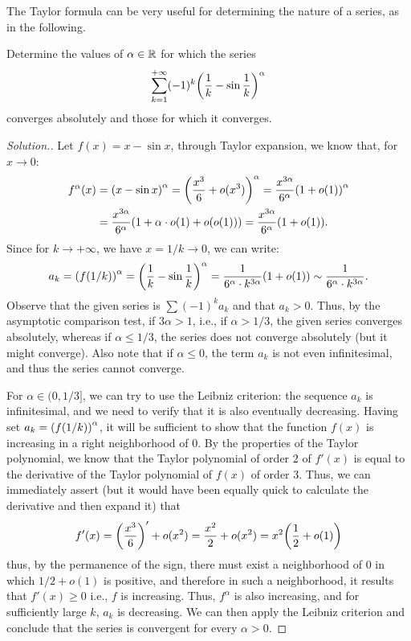 The Taylor formula can be very useful for determining the nature of a series, as
in the following.
\begin{exercise}
Determine the values of $\alpha \in {\mathbb R}$ for which the series
\[
  \sum_{k=1}^{+\infty}(-1)^k {\left( \frac 1 k - \sin \frac 1 k \right)}^\alpha
\]
converges absolutely and those for which it converges.
\end{exercise}
\begin{proof}[Solution.]
Let $f(x) = x - \sin x$,
through Taylor expansion, we know that,
for $x\to 0$:
\begin{align*}
   f^\alpha(x) &= {\left( x - \sin x \right)}^\alpha
   =  {\left( \frac{x^3}{6} + o(x^3) \right)}^\alpha
   = \frac{x^{3\alpha}}{6^\alpha}{\left( 1+o(1) \right)}^\alpha\\
   & = \frac{x^{3\alpha}}{6^\alpha}{\left( 1 + \alpha \cdot o(1) + o(o(1)) \right)}
   = \frac{x^{3\alpha}}{6^\alpha}{\left( 1 + o(1) \right)}.
\end{align*}
Since for $k\to +\infty$, we have $x=1/k \to 0$, we can
write:
\[
  a_k = {\left( f(1/k) \right)}^\alpha = {\left( \frac 1 k - \sin \frac 1 k \right)}^\alpha
  = \frac{1}{6^\alpha \cdot k^{3\alpha}} {\left( 1+o(1) \right)}
  \sim \frac{1}{6^\alpha \cdot k^{3\alpha}}.
\]
Observe that the given series is $\sum (-1)^k a_k$ and that $a_k>0$. Thus, by
the asymptotic comparison test, if $3\alpha > 1$, i.e., if $\alpha >1/3$,
the given series converges absolutely, whereas if $\alpha \le 1/3$, the series
does not converge absolutely (but it might converge).
Also note that if $\alpha \le 0$, the term $a_k$ is not even infinitesimal, and
thus the series cannot converge.

For $\alpha \in (0,1/3]$, we can try to use the Leibniz criterion:
the sequence $a_k$ is infinitesimal, and we need to verify that it is also
eventually decreasing.
Having set $a_k = {\left( f(1/k) \right)}^\alpha$, it will be sufficient to show that
the function $f(x)$ is increasing in a right neighborhood of $0$.
By the properties of the Taylor polynomial, we know that the Taylor polynomial
of order $2$ of $f'(x)$ is equal to the derivative of the Taylor polynomial of
$f(x)$ of order $3$. Thus, we can immediately assert (but it would have been
equally quick to calculate the derivative and then expand it) that
\[
  f'(x)
  = {\left( \frac{x^3}{6} \right)}'  + o(x^2)
  = \frac{x^2}{2} + o(x^2) = x^2 {\left( \frac 1 2 + o(1) \right)}
\]
thus, by the permanence of the sign, there must exist a neighborhood of $0$ in
which
$1/2 + o(1)$ is positive, and therefore in such a neighborhood, it results that
$f'(x)\ge 0$
i.e., $f$ is increasing.
Thus, $f^\alpha$ is also increasing, and for sufficiently large $k$,
$a_k$ is decreasing. We can then apply the Leibniz criterion and
conclude that the series is convergent for every $\alpha >0$.
\end{proof}

